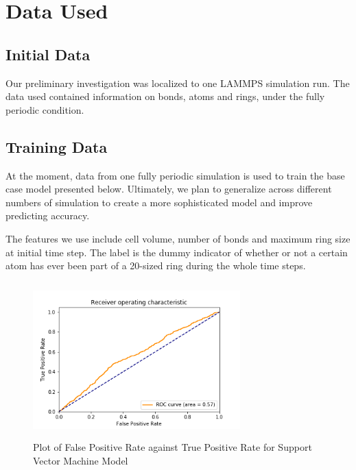 \section{Data Used}
\subsection{Initial Data}

Our preliminary investigation was localized to one LAMMPS simulation run. The data used contained information on bonds, atoms and rings, under the fully periodic condition.

\subsection{Training Data}
At the moment, data from one fully periodic simulation is used to train the base case model presented below.  Ultimately, we plan to generalize across different numbers of simulation to create a more sophisticated model and improve predicting accuracy. 

The features we use include cell volume, number of bonds and maximum ring size at initial time step. The label is the dummy indicator of whether or not a certain atom has ever been part of a 20-sized ring during the whole time steps.


\begin{figure}[!b]
    \centering
    \noindent
\includegraphics[width=8cm , height = 6cm]{images/svm_roc.png}
    \caption{Plot of False Positive Rate against True Positive Rate for Support Vector Machine Model}
    \label{fig:svm_roc}
\end{figure}

